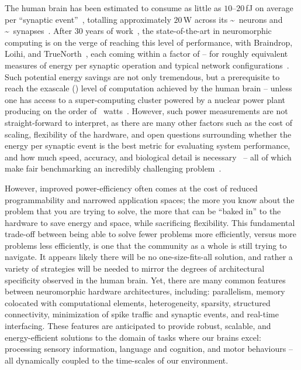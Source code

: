 The human brain has been estimated to consume as little as $10$--$20$\,fJ on average per ``synaptic event''~\citep{cassidy2014real, boahen2017neuromorph}, totalling approximately $20$\,W across its {\textasciitilde{}}~neurons and {\textasciitilde{}}~synapses~\citep{koch2014}.
After $30$ years of work~\citep{cassidy2013design}, the state-of-the-art in neuromorphic computing is on the verge of reaching this level of performance, with Braindrop, Loihi, and TrueNorth~\citep{merolla2014million}, each coming within a factor of -- for roughly equivalent measures of energy per synaptic operation and typical network configurations~\citep{braindrop2019}.
Such potential energy savings are not only tremendous, but a prerequisite to reach the exascale () level of computation achieved by the human brain -- unless one has access to a super-computing cluster powered by a nuclear power plant producing on the order of ~watts~\citep{furber2012build, neurogrid2014}.
However, such power measurements are not straight-forward to interpret, as there are many other factors such as the cost of scaling, flexibility of the hardware, and open questions surrounding whether the energy per synaptic event is the best metric for evaluating system performance, and how much speed, accuracy, and biological detail is necessary~\citep{eliasmith2013build} -- all of which make fair benchmarking an incredibly challenging problem~\citep{stewart2015closed}.

However, improved power-efficiency often comes at the cost of reduced programmability and narrowed application spaces;
the more you know about the problem that you are trying to solve, the more that can be ``baked in'' to the hardware to save energy and space, while sacrificing flexibility.
This fundamental trade-off between being able to solve fewer problems more efficiently, versus more problems less efficiently, is one that the community as a whole is still trying to navigate.
It appears likely there will be no one-size-fits-all solution, and rather a variety of strategies will be needed to mirror the degrees of architectural specificity observed in the human brain.
Yet, there are many common features between neuromorphic hardware architectures, including: parallelism, memory colocated with computational elements, heterogeneity, sparsity, structured connectivity, minimization of spike traffic and synaptic events, and real-time interfacing.
These features are anticipated to provide robust, scalable, and energy-efficient solutions to the domain of tasks where our brains excel: processing sensory information, language and cognition, and motor behaviours -- all dynamically coupled to the time-scales of our environment.


